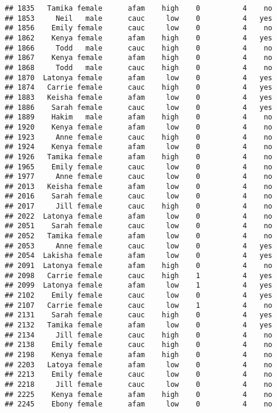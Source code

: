 \documentclass[
]{article}
\begin{document}
\begin{verbatim}
## 1835   Tamika female      afam    high    0          4    no
## 1853     Neil   male      cauc     low    0          4   yes
## 1856    Emily female      cauc     low    0          4    no
## 1862    Kenya female      afam    high    0          4   yes
## 1866     Todd   male      cauc    high    0          4    no
## 1867    Kenya female      afam    high    0          4    no
## 1868     Todd   male      cauc    high    0          4    no
## 1870  Latonya female      afam     low    0          4   yes
## 1874   Carrie female      cauc    high    0          4   yes
## 1883   Keisha female      afam     low    0          4   yes
## 1886    Sarah female      cauc     low    0          4   yes
## 1889    Hakim   male      afam    high    0          4    no
## 1920    Kenya female      afam     low    0          4    no
## 1923     Anne female      cauc    high    0          4    no
## 1924    Kenya female      afam     low    0          4    no
## 1926   Tamika female      afam    high    0          4    no
## 1965    Emily female      cauc     low    0          4    no
## 1977     Anne female      cauc     low    0          4    no
## 2013   Keisha female      afam     low    0          4    no
## 2016    Sarah female      cauc     low    0          4    no
## 2017     Jill female      cauc    high    0          4    no
## 2022  Latonya female      afam     low    0          4    no
## 2051    Sarah female      cauc     low    0          4    no
## 2052   Tamika female      afam     low    0          4    no
## 2053     Anne female      cauc     low    0          4   yes
## 2054  Lakisha female      afam     low    0          4   yes
## 2091  Latonya female      afam    high    0          4    no
## 2098   Carrie female      cauc    high    1          4   yes
## 2099  Latonya female      afam     low    1          4   yes
## 2102    Emily female      cauc     low    0          4   yes
## 2107   Carrie female      cauc     low    1          4    no
## 2131    Sarah female      cauc    high    0          4   yes
## 2132   Tamika female      afam     low    0          4   yes
## 2134     Jill female      cauc    high    0          4    no
## 2138    Emily female      cauc    high    0          4    no
## 2198    Kenya female      afam    high    0          4    no
## 2203   Latoya female      afam     low    0          4    no
## 2213    Emily female      cauc     low    0          4    no
## 2218     Jill female      cauc     low    0          4    no
## 2225    Kenya female      afam    high    0          4    no
## 2245    Ebony female      afam     low    0          4    no

\end{verbatim}
\end{document}
